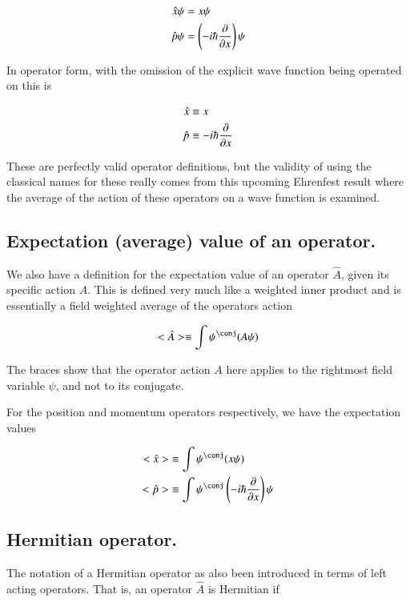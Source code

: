\begin{align*}
\hat{x} \psi &= x \psi \\
\hat{p} \psi &= \left(-i \hbar \frac{\partial {}}{\partial {x}}\right) \psi
\end{align*}

In operator form, with the omission of the explicit wave function being operated on this is

\begin{align*}
\hat{x} &\equiv x  \\
\hat{p} &\equiv -i \hbar \frac{\partial {}}{\partial {x}}
\end{align*}

These are perfectly valid operator definitions, but the validity of using the 
classical names for these really comes from this upcoming Ehrenfest result where
the average of the action of these operators on a wave function is examined.

\subsection{Expectation (average) value of an operator. }

We also have a definition for the expectation value
of an operator $\hat{A}$, given its specific action $A$.
This is defined very much like a weighted inner product
and is essentially a field weighted average of the operators action

\begin{align*}
<\hat{A}> \equiv \int \psi^\conj (A \psi)
\end{align*}

The braces show that the operator action $A$ here applies to the rightmost field variable $\psi$, and not to its conjugate.

For the position and momentum operators respectively, we have the
expectation values

\begin{align*}
<\hat{x}> &\equiv \int \psi^\conj (x \psi) \\
<\hat{p}> &\equiv \int \psi^\conj \left(-i \hbar \PD{x}{}\right) \psi
\end{align*}

\subsection{Hermitian operator. }

The notation of a Hermitian operator as also been introduced in terms of 
left acting operators.  That is, an operator $\hat{A}$ is Hermitian if

